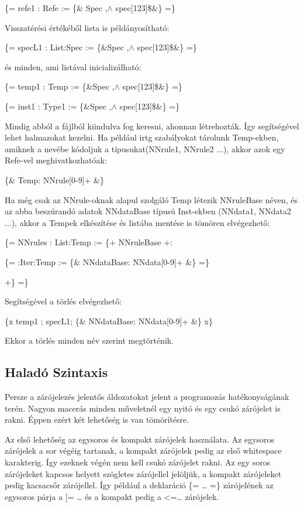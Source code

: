 {

\{= refe1 : Refe := \{\& Spec ,$\land$ spec[123]\$\&\} =\}

Visszatérési értékéből lista is példányosítható:

\{= specL1 : List:Spec := \{\&Spec ,$\land$ spec[123]\$\&\} =\}

és minden, ami listával inicializálható:

\{= temp1 : Temp := \{\&Spec ,$\land$ spec[123]\$\&\} =\}

\{= inst1 : Type1 := \{\&Spec ,$\land$ spec[123]\$\&\} =\}

Mindig abból a fájlból kiindulva fog keresni, ahonnan létrehozták.
Így segítségével lehet halmazokat kezelni.
Ha például irtg szabályokat tárolunk Temp-ekben, amiknek a nevébe kódoljuk a típusukat(NNrule1, NNrule2 ...),
akkor azok egy Refe-vel meghivatkozhatóak:

\{\& Temp: NNrule[0-9]+ \&\}

Ha még csak az NNrule-oknak alapul szolgáló Temp létezik NNruleBase néven, 
és az abba beszúrandó adatok  NNdataBase típusú Inst-ekben (NNdata1, NNdata2 ...),
akkor a Tempek elkészítése és listába mentése is tömören elvégezhető:

\{= NNrules : List:Temp := \{+ NNruleBase +: 

\{= :Iter:Temp := \{\& NNdataBase: NNdata[0-9]+ \&\} =\} 

+\} =\}

Segítségével a törlés elvégezhető:

\{x temp1 ; specL1; \{\& NNdataBase: NNdata[0-9]+ \&\} x\}

Ekkor a törlés minden név szerint megtörténik.



\subsection{Haladó Szintaxis}
Persze a zárójelezés jelentős áldozatokat jelent a programozás hatékonyságának terén. 
Nagyon macerás minden műveletnél egy nyitó és egy csukó zárójelet is rakni. 
Éppen ezért két lehetőség is van tömörítésre.

Az első lehetőség az egysoros és kompakt zárójelek használata. 
Az egysoros zárójelek a sor végéig tartanak, a kompakt zárójelek pedig az első whitespace karakterig. 
Így ezeknek végén nem kell csukó zárójelet rakni. 
Az egy soros zárójeleket kapcsos helyett szögletes zárójellel jelöljük, a kompakt zárójeleket pedig kacsacsőr zárójellel. 
Így például a deklaráció \{= … =\} zárójelének az egysoros párja a [= … és a kompakt pedig a <=… zárójelek.

}
